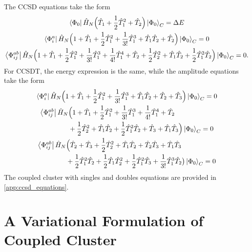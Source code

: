 The CCSD equations take the form 
\begin{gather}
    \bra{\Phi_0} \hat{H}_N
        \Big(\hat{T}_1 + \frac{1}{2}\hat{T}_1^2 + \hat{T}_2\Big)
    \ket{\Phi_0}_C = \Delta E \\
    \bra{\Phi^a_i} \hat{H}_N \Big(
        1 + \hat{T}_1 + \frac{1}{2}\hat{T}_1^2 + \frac{1}{3!}\hat{T}_1^3
        + \hat{T}_1\hat{T}_2 + \hat{T}_2
    \Big) \ket{\Phi_0}_C = 0 \\
    \bra{\Phi^{ab}_{ij}} \hat{H}_N \Big(
        1 + \hat{T}_1 + \frac{1}{2}\hat{T}_1^2 + \frac{1}{3!}\hat{T}_1^3
        + \frac{1}{4!}\hat{T}_1^4 + \hat{T}_2 + \frac{1}{2}\hat{T}_2^2
        + \hat{T}_1 \hat{T}_2 + \frac{1}{2}\hat{T}_1^2 \hat{T}_2
    \Big) \ket{\Phi_0}_C = 0.
\end{gather}
For CCSDT, the energy expression is the same, while the amplitude equations take
the form 
\begin{gather}
    \bra{\Phi^a_i} \hat{H}_N \Big(
        1 + \hat{T}_1 + \frac{1}{2}\hat{T}_1^2 + \frac{1}{3!}\hat{T}_1^3
        + \hat{T}_1\hat{T}_2 + \hat{T}_2 + \hat{T}_3
    \Big) \ket{\Phi_0}_C = 0 \\
    \begin{aligned}
    \bra{\Phi^{ab}_{ij}} \hat{H}_N& \Big(
        1 + \hat{T}_1 + \frac{1}{2}\hat{T}_1^2 + \frac{1}{3!}\hat{T}_1^3
        + \frac{1}{4!}\hat{T}_1^4 + \hat{T}_2 \\ &+ \frac{1}{2}\hat{T}_2^2
        + \hat{T}_1 \hat{T}_2 + \frac{1}{2}\hat{T}_1^2 \hat{T}_2
        + \hat{T}_3 + \hat{T}_1\hat{T}_3
    \Big) \ket{\Phi_0}_C = 0  
    \end{aligned} \\
    \begin{aligned}
    \bra{\Phi^{ab}_{ij}} \hat{H}_N& \Big(
        \hat{T}_2 + \hat{T}_3 + \frac{1}{2}\hat{T}_2^2 + \hat{T}_1\hat{T}_2
        + \hat{T}_2\hat{T}_3 + \hat{T}_1\hat{T}_3 \\
        &+ \frac{1}{2}\hat{T}_1^2\hat{T}_2 + \frac{1}{2}\hat{T}_1\hat{T}_2^2
        + \frac{1}{2} \hat{T}_1^2\hat{T}_3 + \frac{1}{3!} \hat{T}_1^3 \hat{T}_2
    \big) \ket{\Phi_0}_C = 0  
    \end{aligned}
\end{gather}
The coupled cluster with singles and doubles equations are provided
in \autoref{app:ccsd_equations}.

\section{A Variational Formulation of Coupled Cluster}

